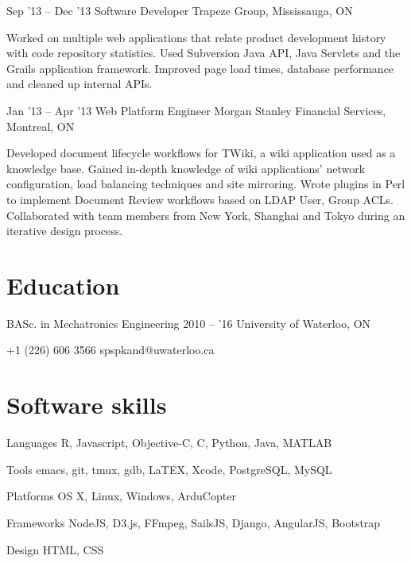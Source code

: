\documentclass{tccv}
\begin{document}
\begin{eventlist}
\item{Sep '13 -- Dec '13}
     {Software Developer}
     {Trapeze Group, Mississauga, ON}

Worked on multiple web applications that relate product development history with code repository statistics. Used Subversion Java API, Java Servlets and the Grails application framework. Improved page load times, database performance and cleaned up internal APIs.

\item{Jan '13 -- Apr '13}
     {Web Platform Engineer}
     {Morgan Stanley Financial Services, Montreal, ON}

Developed document lifecycle workflows for TWiki, a wiki application used as a knowledge base. Gained in-depth knowledge of wiki applications' network configuration, load balancing techniques and site mirroring. Wrote plugins in Perl to implement Document Review workflows based on LDAP User, Group ACLs. Collaborated with team members from New York, Shanghai and Tokyo during an iterative design process.

\end{eventlist}
\section{Education}

\begin{yearlist}

\item[BASc. in Mechatronics Engineering]{2010 -- '16}
  {University of Waterloo, ON}
  {}
\end{yearlist}
    {+1 (226) 606 3566}
    {spspkand@uwaterloo.ca}

\section{Software skills}

\begin{factlist}

    \item{Languages}
     {R, Javascript, Objective-C, C, Python, Java, MATLAB}
    \item{Tools}
     {emacs, git, tmux, gdb, LaTEX, Xcode, PostgreSQL, MySQL}
    \item{Platforms}
     {OS X, Linux, Windows, ArduCopter}
    \item{Frameworks}
     {NodeJS, D3.js, FFmpeg, SailsJS, Django, AngularJS, Bootstrap}
    \item{Design}
     {HTML, CSS}

\end{factlist}
\end{document}

